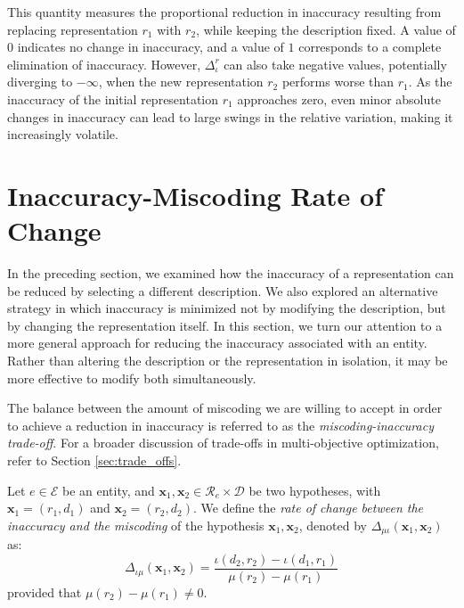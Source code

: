 This quantity measures the proportional reduction in inaccuracy resulting from replacing representation $r_1$ with $r_2$, while keeping the description fixed. A value of $0$ indicates no change in inaccuracy, and a value of $1$ corresponds to a complete elimination of inaccuracy. However, $\Delta^{r}_{\iota}$ can also take negative values, potentially diverging to $-\infty$, when the new representation $r_2$ performs worse than $r_1$. As the inaccuracy of the initial representation $r_1$ approaches zero, even minor absolute changes in inaccuracy can lead to large swings in the relative variation, making it increasingly volatile.

%
%

\section{Inaccuracy-Miscoding Rate of Change}

In the preceding section, we examined how the inaccuracy of a representation can be reduced by selecting a different description. We also explored an alternative strategy in which inaccuracy is minimized not by modifying the description, but by changing the representation itself. In this section, we turn our attention to a more general approach for reducing the inaccuracy associated with an entity. Rather than altering the description or the representation in isolation, it may be more effective to modify both simultaneously.

The balance between the amount of miscoding we are willing to accept in order to achieve a reduction in inaccuracy is referred to as the \emph{miscoding-inaccuracy trade-off}. For a broader discussion of trade-offs in multi-objective optimization, refer to Section \ref{sec:trade_offs}.

\begin{definition}
Let $e \in \mathcal{E}$ be an entity, and $\mathbf{x}_1, \mathbf{x}_2 \in \mathcal{R}_e \times \mathcal{D}$ be two hypotheses, with $\mathbf{x}_1 = (r_1, d_1)$ and $\mathbf{x}_2 = (r_2, d_2)$. We define the \emph{rate of change between the inaccuracy and the miscoding} of the hypothesis $\mathbf{x}_1, \mathbf{x}_2$, denoted by $\Delta_{\mu \iota} ( \mathbf{x}_1, \mathbf{x}_2 )$ as:
\[
\Delta_{\iota \mu} ( \mathbf{x}_1, \mathbf{x}_2 ) = \frac{\iota(d_2, r_2) - \iota(d_1, r_1)}{\mu(r_2) - \mu(r_1)}
\] 
provided that $\mu(r_2) - \mu(r_1) \neq 0$.
\end{definition}

